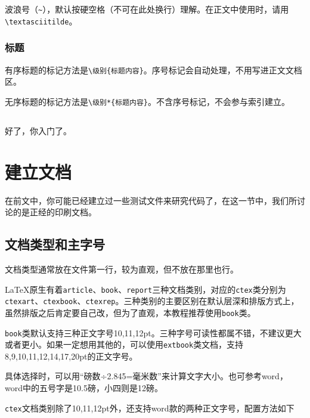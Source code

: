 \documentclass[10pt,openany]{book}
\begin{document}
波浪号（\texttt{\textasciitilde{}}），默认按硬空格（不可在此处换行）理解。在正文中使用时，请用\texttt{\textbackslash{}textasciitilde}。

\subsection{标题}

有序标题的标记方法是\texttt{\textbackslash{}级别\{标题内容\}}。序号标记会自动处理，不用写进正文文档区。

无序标题的标记方法是\texttt{\textbackslash{}级别*\{标题内容\}}。不含序号标记，不会参与索引建立。

\section*{}

好了，你入门了。

\chapter{建立文档}

在前文中，你可能已经建立过一些测试文件来研究代码了，在这一节中，我们所讨论的是正经的印刷文档。

\section{文档类型和主字号}

文档类型通常放在文件第一行，较为直观，但不放在那里也行。



\LaTeX 原生有着\texttt{article}、\texttt{book}、\texttt{report}三种文档类别，对应的\texttt{ctex}类分别为\texttt{ctexart}、\texttt{ctexbook}、\texttt{ctexrep}。三种类别的主要区别在默认层深和排版方式上，虽然排版之后肯定要自己改，但为了直观，本教程推荐使用\texttt{book}类。

\texttt{book}类默认支持三种正文字号10,11,12pt。三种字号可读性都属不错，不建议更大或者更小。如果一定想用其他的，可以使用\texttt{extbook}类文档，支持8,9,10,11,12,14,17,20pt的正文字号。

具体选择时，可以用“磅数÷2.845=毫米数”来计算文字大小。也可参考word，word中的五号字是10.5磅，小四则是12磅。

\texttt{ctex}文档类别除了10,11,12pt外，还支持word款的两种正文字号，配置方法如下


\end{document}
